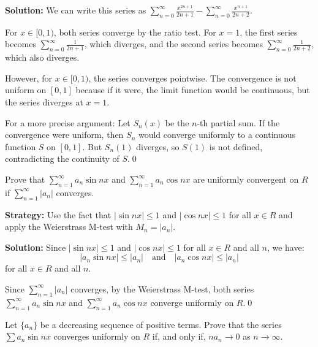 \bigskip\noindent\textbf{Solution:} We can write this series as \( \sum_{n=0}^{\infty} \frac{x^{2n+1}}{2n + 1} - \sum_{n=0}^{\infty} \frac{x^{n+1}}{2n + 2} \).

For \( x \in [0, 1) \), both series converge by the ratio test. For \( x = 1 \), the first series becomes \( \sum_{n=0}^{\infty} \frac{1}{2n + 1} \), which diverges, and the second series becomes \( \sum_{n=0}^{\infty} \frac{1}{2n + 2} \), which also diverges.

However, for \( x \in [0, 1) \), the series converges pointwise. The convergence is not uniform on \([0, 1]\) because if it were, the limit function would be continuous, but the series diverges at \( x = 1 \).

For a more precise argument: Let \( S_n(x) \) be the \( n \)-th partial sum. If the convergence were uniform, then \( S_n \) would converge uniformly to a continuous function \( S \) on \([0, 1]\). But \( S_n(1) \) diverges, so \( S(1) \) is not defined, contradicting the continuity of \( S \).\qed


\begin{problembox}
\begin{problemstatement}
Prove that \(\sum_{n=1}^{\infty} a_n \sin nx \) and \(\sum_{n=1}^{\infty} a_n \cos nx \) are uniformly convergent on \( R \) if \(\sum_{n=1}^{\infty} |a_n| \) converges.
\end{problemstatement}
\end{problembox}

\noindent\textbf{Strategy:} Use the fact that \( |\sin nx| \leq 1 \) and \( |\cos nx| \leq 1 \) for all \( x \in R \) and apply the Weierstrass M-test with \( M_n = |a_n| \).

\bigskip\noindent\textbf{Solution:} Since \( |\sin nx| \leq 1 \) and \( |\cos nx| \leq 1 \) for all \( x \in R \) and all \( n \), we have:
\[|a_n \sin nx| \leq |a_n| \quad \text{and} \quad |a_n \cos nx| \leq |a_n|\]
for all \( x \in R \) and all \( n \).

Since \( \sum_{n=1}^{\infty} |a_n| \) converges, by the Weierstrass M-test, both series \( \sum_{n=1}^{\infty} a_n \sin nx \) and \( \sum_{n=1}^{\infty} a_n \cos nx \) converge uniformly on \( R \).\qed


\begin{problembox}
\begin{problemstatement}
Let \(\{a_n\}\) be a decreasing sequence of positive terms. Prove that the series \(\sum a_n \sin nx \) converges uniformly on \( R \) if, and only if, \( na_n \to 0 \) as \( n \to \infty \).
\end{problemstatement}
\end{problembox}

